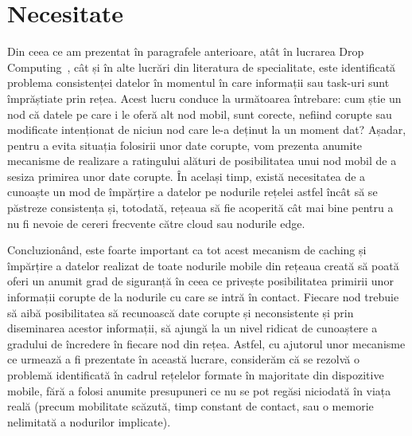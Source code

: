\documentclass[12pt,a4paper]{report}
\begin{document}
\section{Necesitate}
Din ceea ce am prezentat în paragrafele anterioare, atât în lucrarea Drop Computing~\cite{DC}, cât și în alte lucrări din literatura de specialitate, este identificată problema consistenței datelor în momentul în care informații sau task-uri sunt împrăștiate prin rețea. Acest lucru conduce la următoarea întrebare: cum știe un nod că datele pe care i le oferă alt nod mobil, sunt corecte, nefiind corupte sau modificate intenționat de niciun nod care le-a deținut la un moment dat? Așadar, pentru a evita situația folosirii unor date corupte, vom prezenta anumite mecanisme de realizare a ratingului alături de posibilitatea unui nod mobil de a sesiza primirea unor date corupte. În același timp, există necesitatea de a cunoaște un mod de împărțire a datelor pe nodurile rețelei astfel încât să se păstreze consistența și, totodată, rețeaua să fie acoperită cât mai bine pentru a nu fi nevoie de cereri frecvente către cloud sau nodurile edge.

Concluzionând, este foarte important ca tot acest mecanism de caching și împărțire a datelor realizat de toate nodurile mobile din rețeaua creată să poată oferi un anumit grad de siguranță în ceea ce privește posibilitatea primirii unor informații corupte de la nodurile cu care se intră în contact. Fiecare nod trebuie să aibă posibilitatea să recunoască date corupte și neconsistente și prin diseminarea acestor informații, să ajungă la un nivel ridicat de cunoaștere a gradului de încredere în fiecare nod din rețea. Astfel, cu ajutorul unor mecanisme ce urmează a fi prezentate în această lucrare, considerăm că se rezolvă o problemă identificată în cadrul rețelelor formate în majoritate din dispozitive mobile, fără a folosi anumite presupuneri ce nu se pot regăsi niciodată în viața reală (precum mobilitate scăzută, timp constant de contact, sau o memorie nelimitată a nodurilor implicate).
\end{document}
